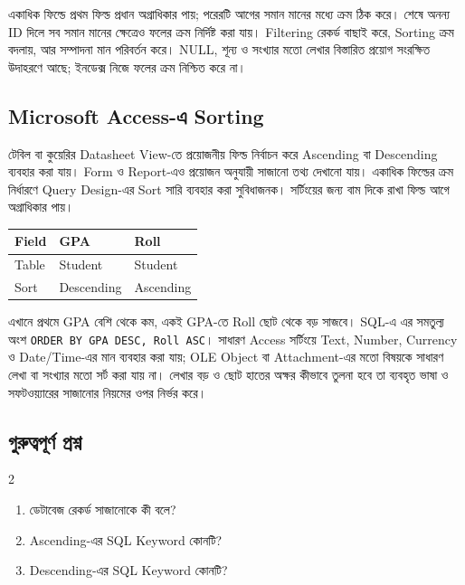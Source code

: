 একাধিক ফিল্ডে প্রথম ফিল্ড প্রধান অগ্রাধিকার পায়; পরেরটি আগের সমান মানের মধ্যে ক্রম ঠিক করে। শেষে অনন্য ID দিলে সব সমান মানের ক্ষেত্রেও ফলের ক্রম নির্দিষ্ট করা যায়। Filtering রেকর্ড বাছাই করে, Sorting ক্রম বদলায়, আর সম্পাদনা মান পরিবর্তন করে। NULL, শূন্য ও সংখ্যার মতো লেখার বিস্তারিত প্রয়োগ সংরক্ষিত উদাহরণে আছে; ইনডেক্স নিজে ফলের ক্রম নিশ্চিত করে না।

\subsection{Microsoft Access-এ Sorting}
টেবিল বা কুয়েরির Datasheet View-তে প্রয়োজনীয় ফিল্ড নির্বাচন করে Ascending বা Descending ব্যবহার করা যায়। Form ও Report-এও প্রয়োজন অনুযায়ী সাজানো তথ্য দেখানো যায়। একাধিক ফিল্ডের ক্রম নির্ধারণে Query Design-এর Sort সারি ব্যবহার করা সুবিধাজনক। সর্টিংয়ের জন্য বাম দিকে রাখা ফিল্ড আগে অগ্রাধিকার পায়।
\begin{flushleft}\begin{minipage}{\linewidth}\raggedright\small
\begin{tabular}{|l|l|l|}\hline
Field & GPA & Roll\\\hline
Table & Student & Student\\\hline
Sort & Descending & Ascending\\\hline
\end{tabular}
\end{minipage}\end{flushleft}
এখানে প্রথমে GPA বেশি থেকে কম, একই GPA-তে Roll ছোট থেকে বড় সাজবে। SQL-এ এর সমতুল্য অংশ \texttt{ORDER BY GPA DESC, Roll ASC}। সাধারণ Access সর্টিংয়ে Text, Number, Currency ও Date/Time-এর মান ব্যবহার করা যায়; OLE Object বা Attachment-এর মতো বিষয়কে সাধারণ লেখা বা সংখ্যার মতো সর্ট করা যায় না। লেখার বড় ও ছোট হাতের অক্ষর কীভাবে তুলনা হবে তা ব্যবহৃত ভাষা ও সফটওয়্যারের সাজানোর নিয়মের ওপর নির্ভর করে।


\subsection{গুরুত্বপূর্ণ প্রশ্ন}

\begin{multicols}{2}
\small
\begin{enumerate}

    \item ডেটাবেজ রেকর্ড সাজানোকে কী বলে?

    \item Ascending-এর SQL Keyword কোনটি?

    \item Descending-এর SQL Keyword কোনটি?

    \end{enumerate}
\end{multicols}

